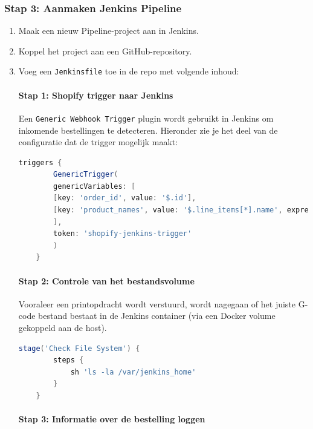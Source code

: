 \subsubsection{Stap 3: Aanmaken Jenkins Pipeline}
\begin{enumerate}
    \item Maak een nieuw Pipeline-project aan in Jenkins.
    \item Koppel het project aan een GitHub-repository.
    \item Voeg een \texttt{Jenkinsfile} toe in de repo met volgende inhoud:

\paragraph*{Stap 1: Shopify trigger naar Jenkins}

Een \texttt{Generic Webhook Trigger} plugin wordt gebruikt in Jenkins om inkomende bestellingen te detecteren. Hieronder zie je het deel van de configuratie dat de trigger mogelijk maakt:

\begin{lstlisting}[language=groovy, caption=Webhook-trigger configuratie in Jenkinsfile]
    triggers {
        GenericTrigger(
        genericVariables: [
        [key: 'order_id', value: '$.id'],
        [key: 'product_names', value: '$.line_items[*].name', expressionType: 'JSONPath']
        ],
        token: 'shopify-jenkins-trigger'
        )
    }
\end{lstlisting}

\paragraph*{Stap 2: Controle van het bestandsvolume}

Vooraleer een printopdracht wordt verstuurd, wordt nagegaan of het juiste G-code bestand bestaat in de Jenkins container (via een Docker volume gekoppeld aan de host).

\begin{lstlisting}[language=groovy, caption=Controle van Jenkins volume]
    stage('Check File System') {
        steps {
            sh 'ls -la /var/jenkins_home'
        }
    }
\end{lstlisting}

\paragraph*{Stap 3: Informatie over de bestelling loggen}


\end{enumerate}
